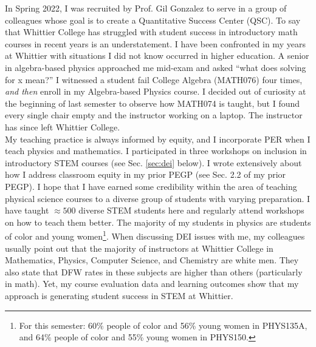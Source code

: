 \documentclass[../../../main.tex]{subfiles}
\begin{document}
\label{sec:qsc}

In Spring 2022, I was recruited by Prof. Gil Gonzalez to serve in a group of colleagues whose goal is to create a Quantitative Success Center (QSC).  To say that Whittier College has struggled with student success in introductory math courses in recent years is an understatement.  I have been confronted in my years at Whittier with situations I did not know occurred in higher education.  A senior in algebra-based physics approached me mid-exam and asked ``what does solving for x mean?'' I witnessed a student fail College Algebra (MATH076) four times, \textit{and then} enroll in my Algebra-based Physics course.  I decided out of curiosity at the beginning of last semester to observe how MATH074 is taught, but I found every single chair empty and the instructor working on a laptop.  The instructor has since left Whittier College.
\\
\vspace{0.15cm}
My teaching practice is always informed by equity, and I incorporate PER when I teach physics and mathematics.  I participated in three workshops on inclusion in introductory STEM courses (see Sec. \ref{sec:dei} below).  I wrote extensively about how I address classroom equity in my prior PEGP (see Sec. 2.2 of my prior PEGP).  I hope that I have earned some credibility within the area of teaching physical science courses to a diverse group of students with varying preparation.  I have taught $\approx 500$ diverse STEM students here and regularly attend workshops on how to teach them better.  The majority of my students in physics are students of color and young women\footnote{For this semester: 60\% people of color and 56\% young women in PHYS135A, and 64\% people of color and 55\% young women in PHYS150.}.  When discussing DEI issues with me, my colleagues usually point out that the majority of instructors at Whittier College in Mathematics, Physics, Computer Science, and Chemistry are white men.  They also state that DFW rates in these subjects are higher than others (particularly in math).  Yet, my course evaluation data and learning outcomes show that my approach is generating student success in STEM at Whittier.
\\
\vspace{0.15cm}
\end{document}
